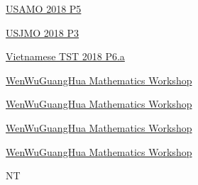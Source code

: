 \hyperref  [problem:USAMO 2018 P5]{USAMO 2018 P5}

\hyperref  [problem:USJMO 2018 P3]{USJMO 2018 P3}

\hyperref  [problem:Vietnamese TST 2018 P6.a]{Vietnamese TST 2018 P6.a}

\hyperref  [problem:WenWuGuangHua Mathematics Workshop]{WenWuGuangHua Mathematics Workshop}

\hyperref  [problem:WenWuGuangHua Mathematics Workshop]{WenWuGuangHua Mathematics Workshop}

\hyperref  [problem:WenWuGuangHua Mathematics Workshop]{WenWuGuangHua Mathematics Workshop}

\hyperref  [problem:WenWuGuangHua Mathematics Workshop]{WenWuGuangHua Mathematics Workshop}



\newpage NT


\hyperref  [problem: ]{ }

\hyperref  [problem:]{}

\hyperref  [problem:]{}

\hyperref  [problem:]{}

\hyperref  [problem:]{}

\hyperref  [problem:]{}

\hyperref  [problem:]{}

\hyperref  [problem:]{}

\hyperref  [problem:]{}

\hyperref  [problem:]{}

\hyperref  [problem:]{}

\hyperref  [problem:]{}

\hyperref  [problem:]{}

\hyperref  [problem:]{}

\hyperref  [problem:]{}

\hyperref  [problem:]{}

\hyperref  [problem:]{}

\hyperref  [problem:]{}

\hyperref  [problem:]{}

\hyperref  [problem:]{}

\hyperref  [problem:]{}

\hyperref  [problem:]{}

\hyperref  [problem:]{}

\hyperref  [problem:]{}

\hyperref  [problem:]{}

\hyperref  [problem:]{}

